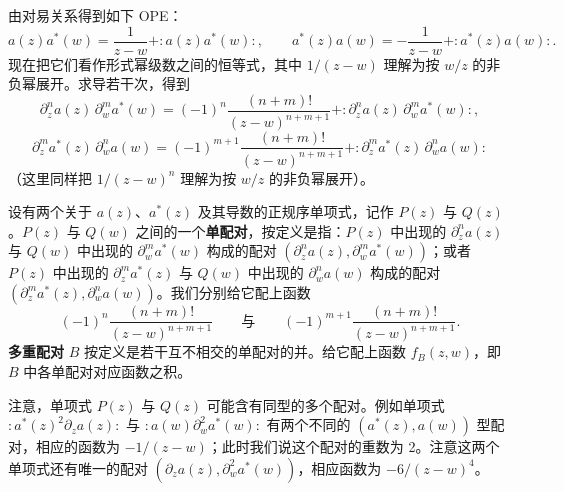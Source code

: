 由对易关系得到如下 OPE：
\[
a(z)a^*(w) = \frac{1}{z-w} + {:}a(z)a^*(w){:},\qquad
a^*(z)a(w) = -\frac{1}{z-w} + {:}a^*(z)a(w){:}.
\]
现在把它们看作形式幂级数之间的恒等式，其中 $1/(z-w)$ 理解为按 $w/z$ 的非负幂展开。求导若干次，得到
\begin{equation}
\partial_z^n a(z)\,\partial_w^m a^*(w) = (-1)^n\frac{(n+m)!}{(z-w)^{n+m+1}} + {:}\partial_z^n a(z)\,\partial_w^m a^*(w){:},
\tag{5.5-1}
\end{equation}
\begin{equation}
\partial_z^m a^*(z)\,\partial_w^n a(w) = (-1)^{m+1}\frac{(n+m)!}{(z-w)^{n+m+1}} + {:}\partial_z^m a^*(z)\,\partial_w^n a(w){:}
\tag{5.5-2}
\end{equation}
（这里同样把 $1/(z-w)^n$ 理解为按 $w/z$ 的非负幂展开）。


设有两个关于 $a(z)$、$a^*(z)$ 及其导数的正规序单项式，记作 $P(z)$ 与 $Q(z)$。$P(z)$ 与 $Q(w)$ 之间的一个\textbf{单配对}，按定义是指：$P(z)$ 中出现的 $\partial_z^n a(z)$ 与 $Q(w)$ 中出现的 $\partial_w^m a^*(w)$ 构成的配对 $(\partial_z^n a(z),\partial_w^m a^*(w))$；或者 $P(z)$ 中出现的 $\partial_z^m a^*(z)$ 与 $Q(w)$ 中出现的 $\partial_w^n a(w)$ 构成的配对 $(\partial_z^m a^*(z),\partial_w^n a(w))$。我们分别给它配上函数
\[
(-1)^n\frac{(n+m)!}{(z-w)^{n+m+1}}
\qquad\text{与}\qquad
(-1)^{m+1}\frac{(n+m)!}{(z-w)^{n+m+1}}.
\]
\textbf{多重配对} $B$ 按定义是若干互不相交的单配对的并。给它配上函数 $f_B(z,w)$，即 $B$ 中各单配对对应函数之积。

注意，单项式 $P(z)$ 与 $Q(z)$ 可能含有同型的多个配对。例如单项式 ${:}a^*(z)^2\partial_z a(z){:}$ 与 ${:}a(w)\partial_w^2 a^*(w){:}$ 有两个不同的 $(a^*(z),a(w))$ 型配对，相应的函数为 $-1/(z-w)$；此时我们说这个配对的重数为 2。注意这两个单项式还有唯一的配对 $(\partial_z a(z),\partial_w^2 a^*(w))$，相应函数为 $-6/(z-w)^4$。

